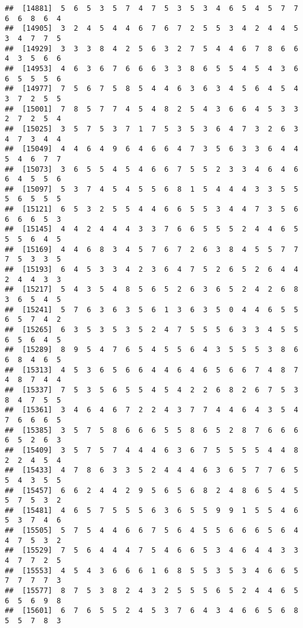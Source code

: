\documentclass[
]{book}
\begin{document}
\begin{verbatim}
##  [14881]  5  6  5  3  5  7  4  7  5  3  5  3  4  6  5  4  5  7  7  6  6  8  6  4
##  [14905]  3  2  4  5  4  4  6  7  6  7  2  5  5  3  4  2  4  4  5  3  4  7  7  5
##  [14929]  3  3  3  8  4  2  5  6  3  2  7  5  4  4  6  7  8  6  6  4  3  5  6  6
##  [14953]  4  6  3  6  7  6  6  6  3  3  8  6  5  5  4  5  4  3  6  6  5  5  5  6
##  [14977]  7  5  6  7  5  8  5  4  4  6  3  6  3  4  5  6  4  5  4  3  7  2  5  5
##  [15001]  7  8  5  7  7  4  5  4  8  2  5  4  3  6  6  4  5  3  3  2  7  2  5  4
##  [15025]  3  5  7  5  3  7  1  7  5  3  5  3  6  4  7  3  2  6  3  4  7  3  4  4
##  [15049]  4  4  6  4  9  6  4  6  6  4  7  3  5  6  3  3  6  4  4  5  4  6  7  7
##  [15073]  3  6  5  5  4  5  4  6  6  7  5  5  2  3  3  4  6  4  6  6  4  5  5  6
##  [15097]  5  3  7  4  5  4  5  5  6  8  1  5  4  4  4  3  3  5  5  5  6  5  5  5
##  [15121]  6  5  3  2  5  5  4  4  6  6  5  5  3  4  4  7  3  5  6  6  6  6  5  3
##  [15145]  4  4  2  4  4  4  3  3  7  6  6  5  5  5  2  4  4  6  5  5  5  6  4  5
##  [15169]  4  4  6  8  3  4  5  7  6  7  2  6  3  8  4  5  5  7  7  7  5  3  3  5
##  [15193]  6  4  5  3  3  4  2  3  6  4  7  5  2  6  5  2  6  4  4  2  4  4  3  3
##  [15217]  5  4  3  5  4  8  5  6  5  2  6  3  6  5  2  4  2  6  8  3  6  5  4  5
##  [15241]  5  7  6  3  6  3  5  6  1  3  6  3  5  0  4  4  6  5  5  6  5  7  4  2
##  [15265]  6  3  5  3  5  3  5  2  4  7  5  5  5  6  3  3  4  5  5  6  5  6  4  5
##  [15289]  8  9  5  4  7  6  5  4  5  5  6  4  3  5  5  5  3  8  6  6  8  4  6  5
##  [15313]  4  5  3  6  5  6  6  4  4  6  4  6  5  6  6  7  4  8  7  4  8  7  4  4
##  [15337]  7  5  3  5  6  5  5  4  5  4  2  2  6  8  2  6  7  5  3  8  4  7  5  5
##  [15361]  3  4  6  4  6  7  2  2  4  3  7  7  4  4  6  4  3  5  4  7  6  6  6  5
##  [15385]  3  5  7  5  8  6  6  6  5  5  8  6  5  2  8  7  6  6  6  6  5  2  6  3
##  [15409]  3  5  7  5  7  4  4  4  6  3  6  7  5  5  5  5  4  4  8  2  2  4  5  4
##  [15433]  4  7  8  6  3  3  5  2  4  4  4  6  3  6  5  7  7  6  5  5  4  3  5  5
##  [15457]  6  6  2  4  4  2  9  5  6  5  6  8  2  4  8  6  5  4  5  5  7  5  3  2
##  [15481]  4  6  5  7  5  5  5  6  3  6  5  5  9  9  1  5  5  4  6  5  3  7  4  6
##  [15505]  5  7  5  4  4  6  6  7  5  6  4  5  5  6  6  6  5  6  4  4  7  5  3  2
##  [15529]  7  5  6  4  4  4  7  5  4  6  6  5  3  4  6  4  4  3  3  4  7  7  2  5
##  [15553]  4  5  4  3  6  6  6  1  6  8  5  5  3  5  3  4  6  6  5  7  7  7  7  3
##  [15577]  8  7  5  3  8  2  4  3  2  5  5  5  6  5  2  4  4  6  5  6  5  6  9  8
##  [15601]  6  7  6  5  5  2  4  5  3  7  6  4  3  4  6  6  5  6  8  5  5  7  8  3

\end{verbatim}
\end{document}
